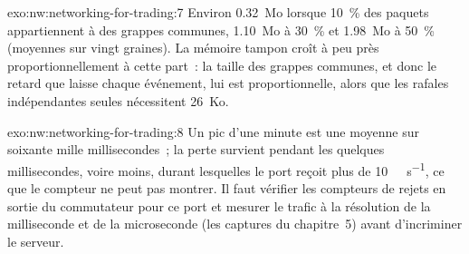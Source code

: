 \begin{solution}{exo:nw:networking-for-trading:7}
Environ 0.32~Mo lorsque 10~\% des paquets appartiennent à des grappes communes, 1.10~Mo à 30~\% et 1.98~Mo à 50~\% (moyennes sur vingt graines). La
mémoire tampon croît à peu près proportionnellement à cette part~: la taille des grappes communes, et donc le retard que laisse chaque événement, lui est
proportionnelle, alors que les rafales indépendantes seules nécessitent 26~Ko.
\end{solution}

\begin{solution}{exo:nw:networking-for-trading:8}
Un pic d'une minute est une moyenne sur soixante mille millisecondes~; la perte survient pendant les quelques millisecondes, voire moins, durant lesquelles le
port reçoit plus de \qty{10}{\giga\bit\per\second}, ce que le compteur ne peut pas montrer. Il faut vérifier les compteurs de rejets en sortie
du commutateur pour ce port et mesurer le trafic à la résolution de la milliseconde et de la microseconde (les captures du chapitre~5) avant
d'incriminer le serveur.
\end{solution}

